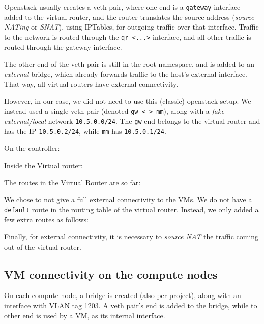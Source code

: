 Openstack usually creates a veth pair, where one end is a
\texttt{gateway} interface added to the virtual router, and the router
translates the source address (\emph{source NATing} or \emph{SNAT}),
using IPTables, for outgoing traffic over that interface. Traffic to
the  network is routed through the
\texttt{qr-\textless{}...\textgreater{}} interface, and all other
traffic is routed through the gateway interface.

The other end of the veth pair is still in the root namespace, and is
added to an \emph{external} bridge, which already forwards traffic to
the host's external interface. That way, all virtual routers have
external connectivity.

However, in our case, we did not need to use this (classic) openstack
setup. We instead used a single veth pair (denoted \texttt{gw\
  \textless{}-\textgreater{}\ mm}), along with a \emph{fake
  external/local} network \texttt{10.5.0.0/24}. The \texttt{gw} end
belongs to the virtual router and has the IP \texttt{10.5.0.2/24},
while \texttt{mm} has \texttt{10.5.0.1/24}.

On the controller:


Inside the Virtual router:


The routes in the Virtual Router are so far:


We chose to not give a full external connectivity to the VMs. We do
not have a \texttt{default} route in the routing table of the virtual
router. Instead, we only added a few extra routes as follows:


Finally, for external connectivity, it is necessary to \emph{source
  NAT} the traffic coming out of the virtual router.


\subsection{VM connectivity on the compute nodes}
\label{section:connectivity:compute:nodes}

On each compute node, a bridge is created (also per project), along
with an interface with VLAN tag 1203. A veth pair's end is added to
the bridge, while to other end is used by a VM, as its internal
interface.

